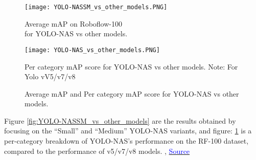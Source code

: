\begin{figure}[H]
  \begin{minipage}{0.48\textwidth}
    \centering
    \texttt{[image: YOLO-NASSM\_vs\_other\_models.PNG]}
    \caption{Average mAP on Roboflow-100 \\for YOLO-NAS vs other models.}
    \label{fig:YOLO-NASSM_vs_other_models}
  \end{minipage}%
  \begin{minipage}{0.5\textwidth}
    \centering
    \texttt{[image: YOLO-NAS\_vs\_other\_models.PNG]}
    \caption{Per category mAP score for YOLO-NAS vs other models.
    Note: For Yolo vV5/v7/v8}
    \label{fig:YOLO-NAS_vs_other_models}
  \end{minipage}
  \caption{Average mAP and Per category mAP score for YOLO-NAS vs other models.}
\end{figure}
Figure \ref{fig:YOLO-NASSM_vs_other_models} are the results obtained by focusing on the “Small” and “Medium” YOLO-NAS variants, and figure: \ref{fig:YOLO-NAS_vs_other_models} is a per-category breakdown of YOLO-NAS’s performance on the RF-100 dataset, compared to the performance of v5/v7/v8 models. \cite{YOLO-NAS}, \cite{yolo-nas-v8-sota}
\href{https://deci.ai/blog/yolo-nas-object-detection-foundation-model/}{\textcolor{blue}{Source}}
